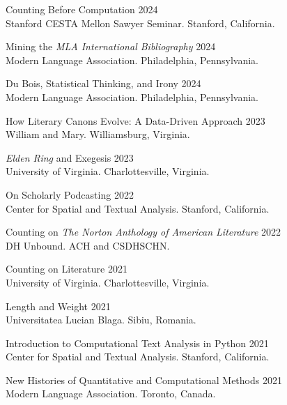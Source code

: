 \documentclass[
  12pt,
  letterpaper,
]{article}
\begin{document}
Counting Before Computation \hfill 2024\\
Stanford CESTA Mellon Sawyer Seminar. Stanford, California.

Mining the \emph{MLA International Bibliography} \hfill 2024\\
\hspace*{0.333em} Modern Language Association. Philadelphia, Pennsylvania.

Du Bois, Statistical Thinking, and Irony \hfill 2024\\
\hspace*{0.333em} Modern Language Association. Philadelphia, Pennsylvania.

How Literary Canons Evolve: A Data-Driven Approach \hfill 2023\\
\hspace*{0.333em} William and Mary. Williamsburg, Virginia.

\emph{Elden Ring} and Exegesis \hfill 2023\\
\hspace*{0.333em} University of Virginia. Charlottesville, Virginia.

On Scholarly Podcasting \hfill 2022\\
\hspace*{0.333em} Center for Spatial and Textual Analysis. Stanford,
California.

Counting on \emph{The Norton Anthology of American Literature}
\hfill 2022\\
\hspace*{0.333em} DH Unbound. ACH and CSDH\textbar SCHN.

Counting on Literature \hfill 2021\\
\hspace*{0.333em} University of Virginia. Charlottesville, Virginia.

Length and Weight \hfill 2021\\
\hspace*{0.333em} Universitatea Lucian Blaga. Sibiu, Romania.

Introduction to Computational Text Analysis in Python \hfill 2021\\
\hspace*{0.333em} Center for Spatial and Textual Analysis. Stanford,
California.

New Histories of Quantitative and Computational Methods \hfill 2021\\
\hspace*{0.333em} Modern Language Association. Toronto, Canada.
\end{document}
